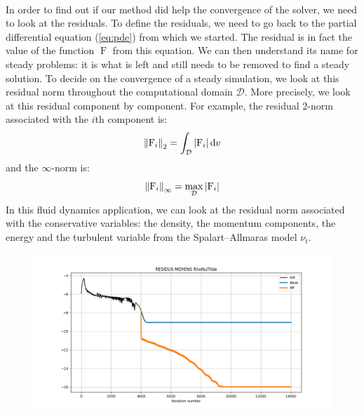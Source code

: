         \paragraph{}
        In order to find out if our method did help the convergence of the solver, we need to look at the residuals.
        To define the residuals, we need to go back to the partial differential equation (\ref{eq:pde}) from which we started.
        The residual is in fact the value of the function $\operatorname{F}$ from this equation.
        We can then understand its name for steady problems: it is what is left and still needs to be removed to find a steady solution.
        To decide on the convergence of a steady simulation, we look at this residual norm throughout the computational domain $\mathcal{D}$.
        More precisely, we look at this residual component by component.
        For example, the residual 2-norm associated with the $i$th component is:
        \begin{equation}
          \norm[2]{\operatorname{F}_i} = \int_\mathcal{D} \left| \operatorname{F}_i \right| \mathrm{d}v
        \end{equation}
        and the $\infty$-norm is:
        \begin{equation}
          \norm[\infty]{\operatorname{F}_i} = \max_\mathcal{D} \left| \operatorname{F}_i \right|
        \end{equation}
        In this fluid dynamics application, we can look at the residual norm associated with the conservative variables: the density, the momentum components, the energy and the turbulent variable from the Spalart--Allmaras model $\nu_t$.

        \begin{figure}
          \centering
          \includegraphics[width=\textwidth]{figures/rae_residuals.png}
          \caption{}
          \label{fig:rae_residuals}
        \end{figure}

